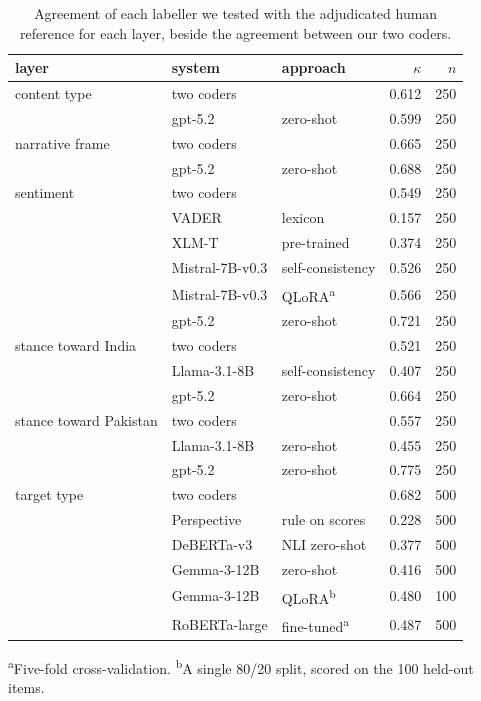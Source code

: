 \begin{table}[htbp]
\centering
\caption{Agreement of each labeller we tested with the adjudicated human reference
for each layer, beside the agreement between our two coders.}
\label{tab:benchmark}
\small
\setlength{\tabcolsep}{3pt}
\begin{tabularx}{\linewidth}{@{}>{\raggedright\arraybackslash}p{1.55cm}l>{\raggedright\arraybackslash}Xrr@{}}
\toprule
layer & system & approach & $\kappa$ & $n$ \\
\midrule
content type & two coders &  & 0.612 & 250 \\
 & gpt-5.2 & zero-shot & 0.599 & 250 \\
\midrule
narrative frame & two coders &  & 0.665 & 250 \\
 & gpt-5.2 & zero-shot & 0.688 & 250 \\
\midrule
sentiment & two coders &  & 0.549 & 250 \\
 & VADER & lexicon & 0.157 & 250 \\
 & XLM-T & pre-trained & 0.374 & 250 \\
 & Mistral-7B-v0.3 & self-consistency & 0.526 & 250 \\
 & Mistral-7B-v0.3 & QLoRA\textsuperscript{a} & 0.566 & 250 \\
 & gpt-5.2 & zero-shot & 0.721 & 250 \\
\midrule
stance toward India & two coders &  & 0.521 & 250 \\
 & Llama-3.1-8B & self-consistency & 0.407 & 250 \\
 & gpt-5.2 & zero-shot & 0.664 & 250 \\
\midrule
stance toward Pakistan & two coders &  & 0.557 & 250 \\
 & Llama-3.1-8B & zero-shot & 0.455 & 250 \\
 & gpt-5.2 & zero-shot & 0.775 & 250 \\
\midrule
target type & two coders &  & 0.682 & 500 \\
 & Perspective & rule on scores & 0.228 & 500 \\
 & DeBERTa-v3 & NLI zero-shot & 0.377 & 500 \\
 & Gemma-3-12B & zero-shot & 0.416 & 500 \\
 & Gemma-3-12B & QLoRA\textsuperscript{b} & 0.480 & 100 \\
 & RoBERTa-large & fine-tuned\textsuperscript{a} & 0.487 & 500 \\
\bottomrule
\end{tabularx}
\vspace{2pt}
{\footnotesize \textsuperscript{a}Five-fold cross-validation.
\textsuperscript{b}A single 80/20 split, scored on the 100 held-out items.\par}
\end{table}